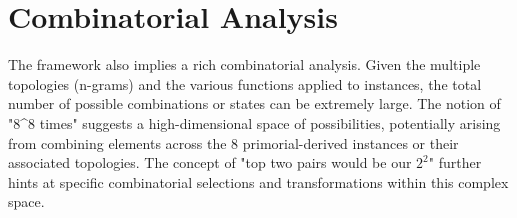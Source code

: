 \section{Combinatorial Analysis}
The framework also implies a rich combinatorial analysis. Given the multiple topologies (n-grams) and the various functions applied to instances, the total number of possible combinations or states can be extremely large. The notion of "8^8 times" suggests a high-dimensional space of possibilities, potentially arising from combining elements across the 8 primorial-derived instances or their associated topologies. The concept of "top two pairs would be our $2^2$" further hints at specific combinatorial selections and transformations within this complex space.